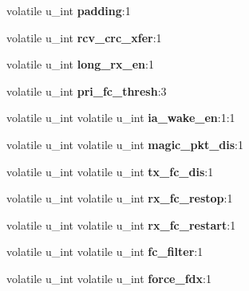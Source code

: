 \begin{DoxyCompactItemize}
volatile u\+\_\+int {\bfseries padding}\+:1
\item 
\mbox{\label{structfxp__cb__config_add3a40dd69be9a4ec7bdbeb9c8b582b6}} 
volatile u\+\_\+int {\bfseries rcv\+\_\+crc\+\_\+xfer}\+:1
\item 
\mbox{\label{structfxp__cb__config_aa12d965ba8079f0d899f6d6ed8807cf4}} 
volatile u\+\_\+int {\bfseries long\+\_\+rx\+\_\+en}\+:1
\item 
\mbox{\label{structfxp__cb__config_a7f09693723e12a824b5e1301674a316f}} 
volatile u\+\_\+int {\bfseries pri\+\_\+fc\+\_\+thresh}\+:3
\item 
\mbox{\label{structfxp__cb__config_a4770b2a9607019cbe51568df3a3a11ff}} 
volatile u\+\_\+int volatile u\+\_\+int {\bfseries ia\+\_\+wake\+\_\+en}\+:1\+:1
\item 
\mbox{\label{structfxp__cb__config_a5c24677d4eae73ffaaac50c4932b07e0}} 
volatile u\+\_\+int volatile u\+\_\+int {\bfseries magic\+\_\+pkt\+\_\+dis}\+:1
\item 
\mbox{\label{structfxp__cb__config_afeb90fc841a8da7032826a859d8ed2e8}} 
volatile u\+\_\+int volatile u\+\_\+int {\bfseries tx\+\_\+fc\+\_\+dis}\+:1
\item 
\mbox{\label{structfxp__cb__config_a38b55120f52a98446e87040bd3ef91cb}} 
volatile u\+\_\+int volatile u\+\_\+int {\bfseries rx\+\_\+fc\+\_\+restop}\+:1
\item 
\mbox{\label{structfxp__cb__config_aacfe56641e730161160e1878c7d2f765}} 
volatile u\+\_\+int volatile u\+\_\+int {\bfseries rx\+\_\+fc\+\_\+restart}\+:1
\item 
\mbox{\label{structfxp__cb__config_ae3c9be564d3d4c7c596b761ea6d69818}} 
volatile u\+\_\+int volatile u\+\_\+int {\bfseries fc\+\_\+filter}\+:1
\item 
\mbox{\label{structfxp__cb__config_adbc3f808dc1763c23cfc700549748c1c}} 
volatile u\+\_\+int volatile u\+\_\+int {\bfseries force\+\_\+fdx}\+:1

\end{DoxyCompactItemize}
